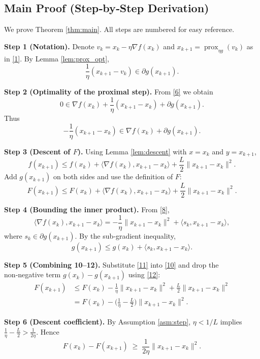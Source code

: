 \documentclass{article}
\newcommand{\prox}{\operatorname{prox}}
\newcommand{\grad}{\nabla}
\begin{document}
\begin{itemize}
\section*{Main Proof (Step‑by‑Step Derivation)}
We prove Theorem \ref{thm:main}. All steps are numbered for easy reference.

\medskip
\noindent\textbf{Step 1 (Notation).} Denote $v_{k}=x_{k}-\eta\grad f(x_{k})$ and $x_{k+1}= \prox_{\eta g}(v_{k})$ as in \eqref{1}. By Lemma \ref{lem:prox_opt},
\begin{equation}
\frac{1}{\eta}(x_{k+1}-v_{k})\in\partial g(x_{k+1}).
\tag{6}
\end{equation}

\noindent\textbf{Step 2 (Optimality of the proximal step).} From \eqref{6} we obtain
\[
0\in\grad f(x_{k})+\frac{1}{\eta}(x_{k+1}-x_{k})+\partial g(x_{k+1}).
\tag{7}
\]
Thus
\[
-\frac{1}{\eta}(x_{k+1}-x_{k})\in \grad f(x_{k})+\partial g(x_{k+1}).
\tag{8}
\]

\noindent\textbf{Step 3 (Descent of $F$).} Using Lemma \ref{lem:descent} with $x=x_{k}$ and $y=x_{k+1}$,
\[
f(x_{k+1})\le f(x_{k})+\langle\grad f(x_{k}),x_{k+1}-x_{k}\rangle+\frac{L}{2}\|x_{k+1}-x_{k}\|^{2}.
\tag{9}
\]
Add $g(x_{k+1})$ on both sides and use the definition of $F$:
\[
F(x_{k+1})\le F(x_{k})+\langle\grad f(x_{k}),x_{k+1}-x_{k}\rangle+\frac{L}{2}\|x_{k+1}-x_{k}\|^{2}.
\tag{10}
\]

\noindent\textbf{Step 4 (Bounding the inner product).} From \eqref{8},
\[
\langle\grad f(x_{k}),x_{k+1}-x_{k}\rangle
= -\frac{1}{\eta}\|x_{k+1}-x_{k}\|^{2}
    +\langle s_{k},x_{k+1}-x_{k}\rangle,
\tag{11}
\]
where $s_{k}\in\partial g(x_{k+1})$. By the sub‑gradient inequality,
\[
g(x_{k+1})\le g(x_{k})+\langle s_{k},x_{k+1}-x_{k}\rangle.
\tag{12}
\]

\noindent\textbf{Step 5 (Combining 10–12).} Substitute \eqref{11} into \eqref{10} and drop the non‑negative term $g(x_{k})-g(x_{k+1})$ using \eqref{12}:
\[
\begin{aligned}
F(x_{k+1})
&\le F(x_{k})-\frac{1}{\eta}\|x_{k+1}-x_{k}\|^{2}
    +\frac{L}{2}\|x_{k+1}-x_{k}\|^{2}\\
&=F(x_{k})-\Big(\frac{1}{\eta}-\frac{L}{2}\Big)\|x_{k+1}-x_{k}\|^{2}.
\end{aligned}
\tag{13}
\]

\noindent\textbf{Step 6 (Descent coefficient).} By Assumption \ref{asm:step}, $\eta<1/L$ implies $\frac{1}{\eta}-\frac{L}{2}> \frac{1}{2\eta}$. Hence
\[
F(x_{k})-F(x_{k+1})\;\ge\;\frac{1}{2\eta}\|x_{k+1}-x_{k}\|^{2}.
\tag{14}
\]


\end{itemize}
\end{document}
